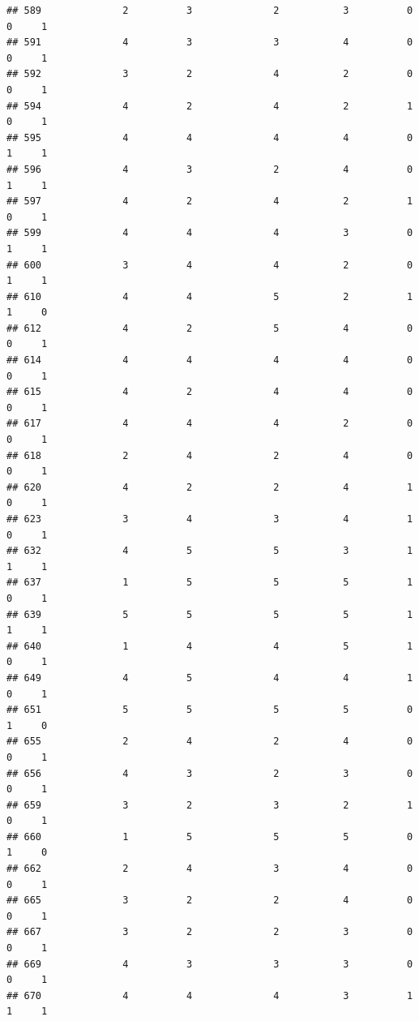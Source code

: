 \documentclass[
]{article}
\begin{document}
\begin{verbatim}
## 589              2          3              2           3          0    0     1
## 591              4          3              3           4          0    0     1
## 592              3          2              4           2          0    0     1
## 594              4          2              4           2          1    0     1
## 595              4          4              4           4          0    1     1
## 596              4          3              2           4          0    1     1
## 597              4          2              4           2          1    0     1
## 599              4          4              4           3          0    1     1
## 600              3          4              4           2          0    1     1
## 610              4          4              5           2          1    1     0
## 612              4          2              5           4          0    0     1
## 614              4          4              4           4          0    0     1
## 615              4          2              4           4          0    0     1
## 617              4          4              4           2          0    0     1
## 618              2          4              2           4          0    0     1
## 620              4          2              2           4          1    0     1
## 623              3          4              3           4          1    0     1
## 632              4          5              5           3          1    1     1
## 637              1          5              5           5          1    0     1
## 639              5          5              5           5          1    1     1
## 640              1          4              4           5          1    0     1
## 649              4          5              4           4          1    0     1
## 651              5          5              5           5          0    1     0
## 655              2          4              2           4          0    0     1
## 656              4          3              2           3          0    0     1
## 659              3          2              3           2          1    0     1
## 660              1          5              5           5          0    1     0
## 662              2          4              3           4          0    0     1
## 665              3          2              2           4          0    0     1
## 667              3          2              2           3          0    0     1
## 669              4          3              3           3          0    0     1
## 670              4          4              4           3          1    1     1

\end{verbatim}
\end{document}
